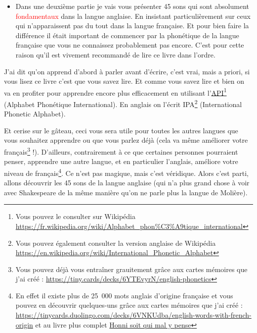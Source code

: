 \documentclass[12pt,a4paper]{book}
\begin{document}
\begin{itemize}
\item Dans une deuxième partie je vais vous présenter 45 sons qui sont absolument
\textcolor{red}{fondamentaux} dans la langue anglaise. En insistant
particulièrement sur ceux qui n'apparaissent pas du tout dans la
langue française. Et pour bien faire la différence il était important
de commencer par la phonétique de la langue française que vous ne
connaissez probablement pas encore. C'est pour cette raison qu'il est
vivement recommandé de lire ce livre dans l'ordre.
\end{itemize}
J'ai dit qu'on apprend d'abord à parler avant d'écrire, c'est vrai,
mais a priori, si vous lisez ce livre c'est que vous savez lire. Et
comme vous savez lire et bien on va en profiter pour apprendre encore
plus efficacement en utilisant
l'\href{https://fr.wikipedia.org/wiki/Alphabet\_phon\%25C3\%25A9tique\_international}{API}\footnote{Vous
pouvez le consulter sur Wikipédia \url{https://fr.wikipedia.org/wiki/Alphabet_phon\%C3\%A9tique_international}}
(Alphabet Phonétique International). En anglais on l'écrit
IPA\footnote{Vous pouvez également consulter la version anglaise de
  Wikipédia \url{https://en.wikipedia.org/wiki/International_Phonetic_Alphabet}}
(International Phonetic Alphabet).\par

Et cerise sur le gâteau, ceci
vous sera utile pour toutes les autres langues que vous souhaitez
apprendre ou que vous parlez déjà (cela va même améliorer votre
français\footnote{Vous pouvez déjà vous entraîner grauitement grâce
  aux cartes mémoires que j'ai créé : \url{https://tiny.cards/decks/6YTEvyrN/english-phonetics}} !). D'ailleurs, contrairement à ce que certaines personnes
pourraient penser, apprendre une autre langue, et en particulier
l'anglais, améliore votre niveau de français\footnote{En effet il existe plus de 25~000 mots anglais
  d'origine française et vous pouvez en découvrir quelques-uns grâce
  aux cartes mémoires que j'ai créé :
  \url{https://tinycards.duolingo.com/decks/6VNKUdba/english-words-with-french-origin}
et au livre plus complet \href{https://www.amazon.fr/gp/product/225315444X/ref=as_li_tl?ie=UTF8&camp=1642&creative=6746&creativeASIN=225315444X&linkCode=as2&tag=wwwbecomefree-21&linkId=5317e7b0e063b4d6c7c676b11420e49d}{Honni soit qui mal y pense} }. Ce n'est pas magique,
mais c'est véridique. Alors c'est parti, allons découvrir les 45 sons
de la langue anglaise (qui n'a plus grand chose à voir avec
Shakespeare de la même manière qu'on ne parle plus la langue de
Molière).
\end{document}
